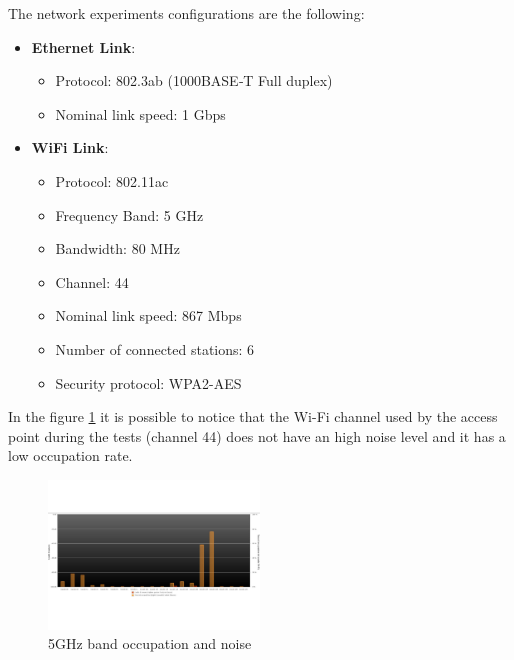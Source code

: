 The network experiments configurations are the following:

\begin{itemize}
    \item \textbf{Ethernet Link}:
    \begin{itemize}
        \item Protocol: 802.3ab (1000BASE‑T Full duplex)
        \item Nominal link speed: 1 Gbps
    \end{itemize}

     \item \textbf{WiFi Link}: 
     \begin{itemize}
         \item Protocol: 802.11ac
         \item Frequency Band: 5 GHz
         \item Bandwidth: 80 MHz
         \item Channel: 44
         \item Nominal link speed: 867 Mbps
         \item Number of connected stations: 6
         \item Security protocol: WPA2-AES
     \end{itemize}
\end{itemize}
In the figure \ref{fig:channel_occupation_and_noise} it is possible to notice that the Wi-Fi channel used by the access point during the tests (channel 44) does not have an high noise level and it has a low occupation rate.

\begin{figure}[H]
\centering
\vspace{-30pt} 
\includegraphics[width=0.5\textwidth]{images/channel_occupation_and_noise.pdf}
\vspace{-50pt} 
\caption{5GHz band occupation and noise}
\label{fig:channel_occupation_and_noise}
\end{figure}
\vspace{-5pt}
    

